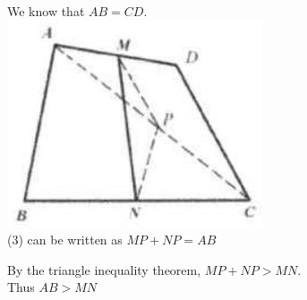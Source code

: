 \documentclass{article}
\begin{document}
We know that \(A B=C D\).\\
\centering
\includegraphics[width=\textwidth]{images/reasoning_image_1.jpg}\\
(3) can be written as \(M P+N P=A B\)

By the triangle inequality theorem, \(M P+N P>M N\).\\
Thus \(A B>M N\)
\end{document}
